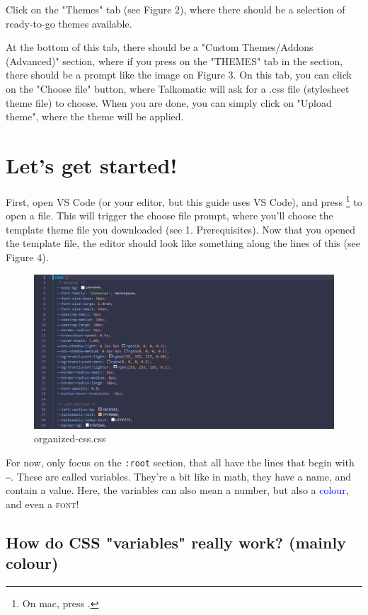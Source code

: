 \documentclass{article}
\begin{document}
Click on the "Themes" tab (see Figure 2), where there should be a selection of ready-to-go themes available.

At the bottom of this tab, there should be a "Custom Themes/Addons (Advanced)" section, where if you press on the "THEMES" tab in the section, there should be a prompt like the image on Figure 3. On this tab, you can click on the "Choose file" button, where Talkomatic will ask for a .css file (stylesheet theme file) to choose. When you are done, you can simply click on "Upload theme", where the theme will be applied.
\clearpage

\section{Let's get started!}

First, open VS Code (or your editor, but this guide uses VS Code), and press \footnote{On mac, press .} to open a file. This will trigger the choose file prompt, where you'll choose the template theme file you downloaded (see 1. Prerequisites). Now that you opened the template file, the editor should look like something along the lines of this (see Figure 4).
\begin{figure}
    \centering
    \includegraphics[width=1\linewidth]{4.png}
    \caption{organized-css.css}
    \label{fig:enter-label}
\end{figure}

For now, only focus on the \texttt{:root} section, that all have the lines that begin with \texttt{--}. These are called variables. They're a bit like in math, they have a name, and contain a value. Here, the variables can also mean a number, but also a \textcolor{blue}{colour}, and even a \textsc{font}!

\subsection{How do CSS "variables" really work? (mainly colour)}
\end{document}
